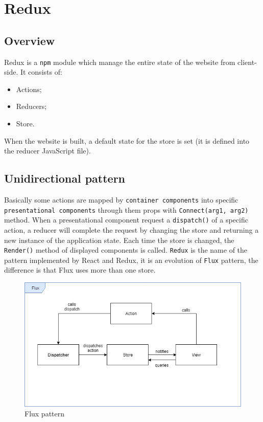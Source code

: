 \section{Redux} 
\subsection{Overview}
Redux is a \texttt{npm} module which manage the entire state of the website from client-side. It consists of:
\begin{itemize}
	\item Actions;
	\item Reducers;
	\item Store.
\end{itemize}
When the website is built, a default state for the store is set (it is defined into the reducer JavaScript file).
\subsection{Unidirectional pattern} 
Basically some actions are mapped by \texttt{container components} into specific \texttt{presentational components} through them props with \texttt{Connect(arg1, arg2)} method. When a presentational component request a \texttt{dispatch()} of a specific action, a reducer will complete the request by changing the store and returning a new instance of the application state. Each time the store is changed, the \texttt{Render()} method of displayed components is called.
\texttt{Redux} is the name of the pattern implemented by React and Redux, it is an evolution of \texttt{Flux} pattern, the difference is that Flux uses more than one store.\\
\begin{figure}[H]
	\centering\includegraphics[scale = 0.6]{res/images/Flux.png}
	\caption{Flux pattern}
\end{figure}

